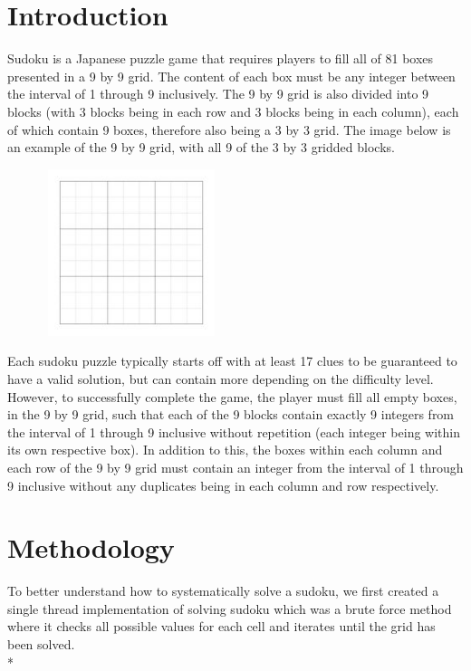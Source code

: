 \documentclass[conference]{IEEEtran}
\begin{document}
\vspace{1\baselineskip}

\section{Introduction}
Sudoku is a Japanese puzzle game that requires players to fill all of 81 boxes presented in a 9 by 9 grid. The content of each box must be any integer between the interval of 1 through 9 inclusively. The 9 by 9 grid is also divided into 9 blocks (with 3 blocks being in each row and 3 blocks being in each column), each of which contain 9 boxes, therefore also being a 3 by 3 grid. The image below is an example of the 9 by 9 grid, with all 9 of the 3 by 3 gridded blocks.

\vspace{1\baselineskip}
\begin{figure}[H]
\centering
\includegraphics[width=5.11cm,height=4.87cm]{sudokujpg.jpg}
\end{figure}

\vspace{1\baselineskip}
Each sudoku puzzle typically starts off with at least 17 clues to be guaranteed to have a valid solution, but can contain more depending on the difficulty level. However, to successfully complete the game, the player must fill all empty boxes, in the 9 by 9 grid, such that each of the 9 blocks contain exactly 9 integers from the interval of 1 through 9 inclusive without repetition (each integer being within its own respective box). In addition to this, the boxes within each column and each row of the 9 by 9 grid must contain an integer from the interval of 1 through 9 inclusive without any duplicates being in each column and row respectively. 

\vspace{1\baselineskip}

\section{Methodology}
To better understand how to systematically solve a sudoku, we first created a single thread implementation of solving sudoku
which was a brute force method where it checks all possible values for each cell and iterates until the grid has been solved.
\\*
\end{document}
